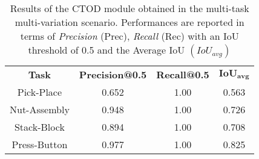\begin{table}[t]
\centering
\caption{Results of the CTOD module obtained in the multi-task multi-variation scenario. Performances are reported in terms of \textit{Precision} (Prec), \textit{Recall} (Rec) with an IoU threshold of 0.5 and the Average IoU $(IoU_{avg})$}
\label{table:ctod_multi_task_performance}
\begin{tabular}{|c|c|c|c|} 
\hline
\textbf{Task} & \textbf{Precision@0.5} & \textbf{Recall@0.5} & $\mathbf{IoU_{avg}}$ \\ 
\hhline{|====|}
Pick-Place & 0.652 & 1.00 & 0.563 \\ 
\hline
Nut-Assembly & 0.948 & 1.00 & 0.726 \\ 
\hline
Stack-Block & 0.894 & 1.00 & 0.708 \\ 
\hline
Press-Button & 0.977 & 1.00 & 0.825 \\
\hline
\end{tabular}
\end{table}

